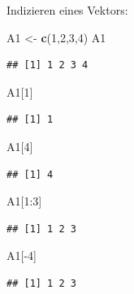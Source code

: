 \documentclass[ignorenonframetext,]{beamer}
\newenvironment{Shaded}{}{}
\newcommand{\KeywordTok}[1]{\textcolor[rgb]{0.00,0.44,0.13}{\textbf{{#1}}}}
\newcommand{\DecValTok}[1]{\textcolor[rgb]{0.25,0.63,0.44}{{#1}}}
\newcommand{\StringTok}[1]{\textcolor[rgb]{0.25,0.44,0.63}{{#1}}}
\newcommand{\NormalTok}[1]{{#1}}
\begin{document}
\begin{frame}[fragile]{Indizieren eines Vektors:}

\begin{Shaded}
\begin{Highlighting}[]
\NormalTok{A1 <-}\StringTok{ }\KeywordTok{c}\NormalTok{(}\DecValTok{1}\NormalTok{,}\DecValTok{2}\NormalTok{,}\DecValTok{3}\NormalTok{,}\DecValTok{4}\NormalTok{)}
\NormalTok{A1}
\end{Highlighting}
\end{Shaded}

\begin{verbatim}
## [1] 1 2 3 4
\end{verbatim}

\begin{Shaded}
\begin{Highlighting}[]
\NormalTok{A1[}\DecValTok{1}\NormalTok{]}
\end{Highlighting}
\end{Shaded}

\begin{verbatim}
## [1] 1
\end{verbatim}

\begin{Shaded}
\begin{Highlighting}[]
\NormalTok{A1[}\DecValTok{4}\NormalTok{]}
\end{Highlighting}
\end{Shaded}

\begin{verbatim}
## [1] 4
\end{verbatim}

\begin{Shaded}
\begin{Highlighting}[]
\NormalTok{A1[}\DecValTok{1}\NormalTok{:}\DecValTok{3}\NormalTok{]}
\end{Highlighting}
\end{Shaded}

\begin{verbatim}
## [1] 1 2 3
\end{verbatim}

\begin{Shaded}
\begin{Highlighting}[]
\NormalTok{A1[-}\DecValTok{4}\NormalTok{]}
\end{Highlighting}
\end{Shaded}

\begin{verbatim}
## [1] 1 2 3
\end{verbatim}

\end{frame}
\end{document}
